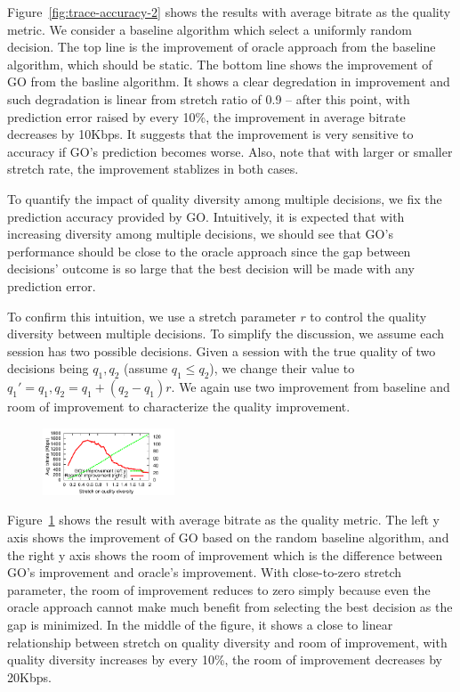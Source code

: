 Figure~\ref{fig:trace-accuracy-2} shows the results with average bitrate as the quality metric. We consider a baseline algorithm which select a uniformly random decision. The top line is the improvement of oracle approach from the baseline algorithm, which should be static. The bottom line shows the improvement of GO from the basline algorithm. 
It shows a clear degredation in improvement and such degradation is linear from stretch ratio of 0.9 -- after this point, with prediction error raised by every 10\%, the improvement in average bitrate decreases by 10Kbps. It suggests that the improvement is very sensitive to accuracy if GO's prediction becomes worse. Also, note that with larger or smaller stretch rate, the improvement stablizes in both cases.






To quantify the impact of quality diversity among multiple decisions, we fix the prediction accuracy provided by GO. Intuitively, it is expected that with increasing diversity among multiple decisions, we should see that GO's performance should be close to the oracle approach since the gap between decisions' outcome is so large that the best decision will be made with any prediction error. 

To confirm this intuition, we use a stretch parameter $r$ to control the quality diversity between multiple decisions. To simplify the discussion, we assume each session has two possible decisions. Given a session with the true quality of two decisions being $q_1, q_2$ (assume $q_1\leq q_2$), we change their value to $q_1'=q_1, q_2=q_1+(q_2-q_1)r$. We again use two improvement from baseline and room of improvement to characterize the quality improvement.

\begin{figure}[h!]
\centering
\includegraphics[width=0.35\textwidth] {figures/newfig/trendDiversity-metricId1-keyGlobal-partition.pdf}
\label{fig:trace-diversity}
\end{figure}

Figure~\ref{fig:trace-diversity} shows the result with average bitrate as the quality metric. The left y axis shows the improvement of GO based on the random baseline algorithm, and the right y axis shows the room of improvement which is the difference between GO's improvement and oracle's improvement. With close-to-zero stretch parameter, the room of improvement reduces to zero simply because even the oracle approach cannot make much benefit from selecting the best decision as the gap is minimized. 
In the middle of the figure, it shows a close to linear relationship between stretch on quality diversity and room of improvement, with quality diversity increases by every 10\%, the room of improvement decreases by 20Kbps. 




